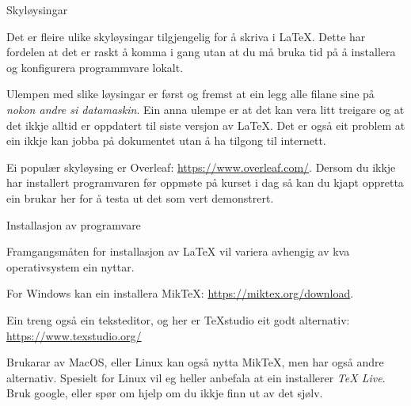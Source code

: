 \begin{frame}{Skyløysingar}

  	
	
  Det er fleire ulike skyløysingar tilgjengelig for å skriva i \LaTeX. Dette har fordelen at det er raskt å komma i gang utan at du må bruka tid på å installera og konfigurera programmvare lokalt.

  Ulempen med slike løysingar er først og fremst at ein legg alle filane sine på \textit{nokon andre si datamaskin}. Ein anna ulempe er at det kan vera litt treigare og at det ikkje alltid er oppdatert til siste versjon av \LaTeX. Det er også eit problem at ein ikkje kan jobba på dokumentet utan å ha tilgong til internett.
	
	Ei populær skyløysing er Overleaf: \url{https://www.overleaf.com/}. Dersom du ikkje har installert programvaren før oppmøte på kurset i dag så kan du kjapt oppretta ein brukar her for å testa ut det som vert demonstrert.
	
\end{frame}


\begin{frame}{Installasjon av programvare}

	
  
	Framgangsmåten for installasjon av \LaTeX{} vil variera avhengig av kva operativsystem ein nyttar.
	
	For Windows kan ein installera MikTeX: \url{https://miktex.org/download}.
	
	Ein treng også ein teksteditor, og her er TeXstudio eit godt alternativ: \url{https://www.texstudio.org/}
	
	Brukarar av MacOS, eller Linux kan også nytta MikTeX, men har også andre alternativ. Spesielt for Linux vil eg heller anbefala at ein installerer \textit{TeX Live}. Bruk google, eller spør om hjelp om du ikkje finn ut av det sjølv.
\end{frame}


